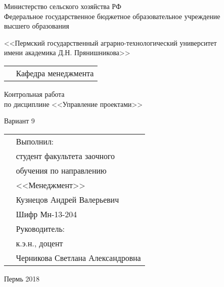 \thispagestyle{empty}
\begin{center}
	Министерство сельского хозяйства РФ \\Федеральное государственное бюджетное образовательное учреждение\\ высшего образования
	\vspace{0.5ex}
	
	<<Пермский государственный аграрно-технологический университет\\ имени академика Д.Н. Прянишникова>>
\end{center}
\vspace{10ex}
\begin{tabularx}{\textwidth}{XX}
	& Кафедра менеджмента \\
\end{tabularx}
\begin{center}
	\vspace{13ex}
	Контрольная работа\\
	по дисциплине <<Управление проектами>> \\
	\vspace{1ex}
	
	Вариант 9
\end{center}
	\vspace{8ex}
	\begin{tabularx}{\textwidth}{XX}
	& Выполнил:\\
	& студент факультета заочного \\
	& обучения по направлению \\
	& <<Менеджмент>> \\
	& Кузнецов Андрей Валерьевич \\
	& Шифр Мн-13-204\\
	& Руководитель:\\
	& к.э.н., доцент\\
	& Черникова Светлана Александровна\\
	\end{tabularx}
\begin{center}
	\vfill
	Пермь 2018
\end{center}
